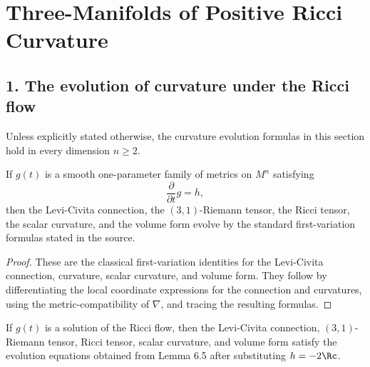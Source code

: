 \chapter{Three-Manifolds of Positive Ricci Curvature}

\section*{1. The evolution of curvature under the Ricci flow}

\begin{remark}
\label{ch06-rem-evolution-formulas-dimension-independent}

Unless explicitly stated otherwise, the curvature evolution formulas in this section hold in every dimension \(n \ge 2\).
\end{remark}

\begin{lemma}
\label{ch06-lem-general-metric-variation}

If \(g(t)\) is a smooth one-parameter family of metrics on \(M^n\) satisfying
\[
\frac{\partial}{\partial t}g=h,
\]
then the Levi-Civita connection, the \((3,1)\)-Riemann tensor, the Ricci tensor, the scalar curvature, and the volume form evolve by the standard first-variation formulas stated in the source.
\end{lemma}

\begin{proof}
\sketch These are the classical first-variation identities for the Levi-Civita connection, curvature, scalar curvature, and volume form. They follow by differentiating the local coordinate expressions for the connection and curvatures, using the metric-compatibility of \(\nabla\), and tracing the resulting formulas.
\end{proof}

\begin{corollary}
\label{ch06-cor-curvature-evolution-under-ricci-flow}

If \(g(t)\) is a solution of the Ricci flow, then the Levi-Civita connection, \((3,1)\)-Riemann tensor, Ricci tensor, scalar curvature, and volume form satisfy the evolution equations obtained from Lemma 6.5 after substituting \(h=-2\Rc\).
\end{corollary}

